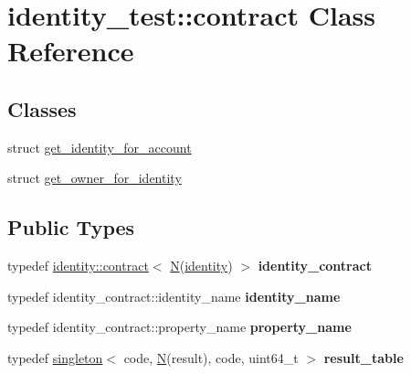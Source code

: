 \hypertarget{classidentity__test_1_1contract}{}\section{identity\+\_\+test\+:\+:contract Class Reference}
\label{classidentity__test_1_1contract}
\subsection*{Classes}
\begin{DoxyCompactItemize}
\item 
struct \mbox{\hyperlink{structidentity__test_1_1contract_1_1get__identity__for__account}{get\+\_\+identity\+\_\+for\+\_\+account}}
\item 
struct \mbox{\hyperlink{structidentity__test_1_1contract_1_1get__owner__for__identity}{get\+\_\+owner\+\_\+for\+\_\+identity}}
\end{DoxyCompactItemize}
\subsection*{Public Types}
\begin{DoxyCompactItemize}
\item 
\mbox{\label{classidentity__test_1_1contract_ab0fe3f206fe5bdf621bb5c779b6edec7}} 
typedef \mbox{\hyperlink{classidentity_1_1contract}{identity\+::contract}}$<$ \mbox{\hyperlink{group__types_gaf9c1edb0e0da55ec6ba09f32f6839529}{N}}(\mbox{\hyperlink{structidentity}{identity}}) $>$ {\bfseries identity\+\_\+contract}
\item 
\mbox{\label{classidentity__test_1_1contract_a9abf202e046b6874253249bcd114cefc}} 
typedef identity\+\_\+contract\+::identity\+\_\+name {\bfseries identity\+\_\+name}
\item 
\mbox{\label{classidentity__test_1_1contract_a4db0471a0b64c44ab8f1fb134431071d}} 
typedef identity\+\_\+contract\+::property\+\_\+name {\bfseries property\+\_\+name}
\item 
\mbox{\label{classidentity__test_1_1contract_a4db7e8a7cea580c99ab1b9a7698b29ab}} 
typedef \mbox{\hyperlink{classaacio_1_1singleton}{singleton}}$<$ code, \mbox{\hyperlink{group__types_gaf9c1edb0e0da55ec6ba09f32f6839529}{N}}(result), code, uint64\+\_\+t $>$ {\bfseries result\+\_\+table}
\end{DoxyCompactItemize}
